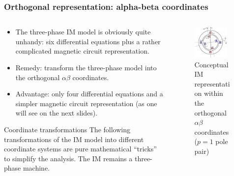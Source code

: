 \begin{frame}
	\frametitle{Orthogonal representation: alpha-beta coordinates}
    \begin{columns}
		\begin{column}{0.55\textwidth}
	       \begin{itemize}
            \item The three-phase IM model is obviously quite unhandy: six differential equations plus a rather complicated magnetic circuit representation.
            \item Remedy: transform the three-phase model into the orthogonal $\alpha\beta$ coordinates.
            \item Advantage: only four differential equations and a simpler magnetic circuit representation (as one will see on the next slides).
           \end{itemize}
           \vspace{-0.4cm}
           \begin{varblock}{Coordinate transformations}
              The following transformations of the IM model into different coordinate systems are pure mathematical ``tricks'' to simplify the analysis. The IM remains a three-phase machine. 
           \end{varblock}
        \end{column}
        \begin{column}{0.45\textwidth}
            \begin{figure}
                \centering
                \includegraphics[width=0.85\textwidth]{fig/lec06/Induction_machine_alpha_beta.pdf}
                \caption{Conceptual IM representation within the orthogonal $\alpha\beta$ coordinates ($p=1$ pole pair)}
                \label{fig:Induction_machine_alpha_beta}
            \end{figure}
        \end{column}
    \end{columns}
\end{frame}

